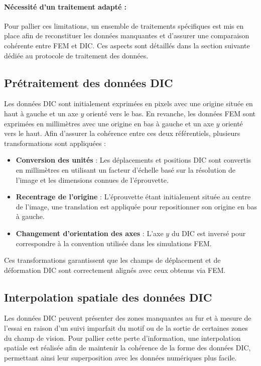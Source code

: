 \documentclass[12pt,a4paper]{article}
\begin{document}
\paragraph{Nécessité d’un traitement adapté :}  
Pour pallier ces limitations, un ensemble de traitements spécifiques est mis en place afin de reconstituer les données manquantes et d’assurer une comparaison cohérente entre FEM et DIC. Ces aspects sont détaillés dans la section suivante dédiée au protocole de traitement des données.



\subsection{Prétraitement des données DIC}
Les données DIC sont initialement exprimées en pixels avec une origine située en haut à gauche et un axe \( y \) orienté vers le bas. En revanche, les données FEM sont exprimées en millimètres avec une origine en bas à gauche et un axe \( y \) orienté vers le haut. Afin d'assurer la cohérence entre ces deux référentiels, plusieurs transformations sont appliquées :

\begin{itemize}
    \item \textbf{Conversion des unités} : Les déplacements et positions DIC sont convertis en millimètres en utilisant un facteur d'échelle basé sur la résolution de l'image et les dimensions connues de l'éprouvette.
    \item \textbf{Recentrage de l'origine} : L'éprouvette étant initialement située au centre de l’image, une translation est appliquée pour repositionner son origine en bas à gauche.
    \item \textbf{Changement d'orientation des axes} : L’axe \( y \) du DIC est inversé pour correspondre à la convention utilisée dans les simulations FEM.
\end{itemize}

Ces transformations garantissent que les champs de déplacement et de déformation DIC sont correctement alignés avec ceux obtenus via FEM.

\subsection{Interpolation spatiale des données DIC}
Les données DIC peuvent présenter des zones manquantes au fur et à mesure de l'essai en raison d'un suivi imparfait du motif ou de la sortie de certaines zones du champ de vision. Pour pallier cette perte d'information, une interpolation spatiale est réalisée afin de maintenir la cohérence de la forme des données DIC, permettant ainsi leur superposition avec les données numériques plus facile.
\end{document}
